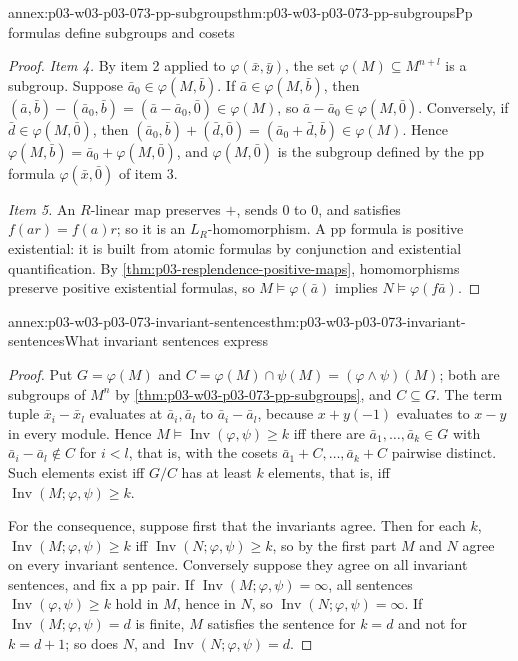 \begin{annexitem}{annex:p03-w03-p03-073-pp-subgroups}{thm:p03-w03-p03-073-pp-subgroups}{Pp formulas define subgroups and cosets}
\begin{proof}
\emph{Item 4.} By item 2 applied to \(\varphi(\bar x,\bar y)\), the set
\(\varphi(M)\subseteq M^{n+l}\) is a subgroup. Suppose
\(\bar a_0\in\varphi(M,\bar b)\). If \(\bar a\in\varphi(M,\bar b)\), then
\((\bar a,\bar b)-(\bar a_0,\bar b)=(\bar a-\bar a_0,\bar 0)\in\varphi(M)\),
so \(\bar a-\bar a_0\in\varphi(M,\bar 0)\). Conversely, if
\(\bar d\in\varphi(M,\bar 0)\), then
\((\bar a_0,\bar b)+(\bar d,\bar 0)=(\bar a_0+\bar d,\bar b)\in\varphi(M)\).
Hence \(\varphi(M,\bar b)=\bar a_0+\varphi(M,\bar 0)\), and
\(\varphi(M,\bar 0)\) is the subgroup defined by the pp formula
\(\varphi(\bar x,\bar 0)\) of item 3.

\emph{Item 5.} An \(R\)-linear map preserves \(+\), sends \(0\) to \(0\),
and satisfies \(f(ar)=f(a)r\); so it is an \(L_R\)-homomorphism. A pp
formula is positive existential: it is built from atomic formulas by
conjunction and existential quantification. By
\cref{thm:p03-resplendence-positive-maps}, homomorphisms preserve
positive existential formulas, so \(M\models\varphi(\bar a)\) implies
\(N\models\varphi(f\bar a)\).
\end{proof}
\end{annexitem}

\begin{annexitem}{annex:p03-w03-p03-073-invariant-sentences}{thm:p03-w03-p03-073-invariant-sentences}{What invariant sentences express}
\begin{proof}
Put \(G=\varphi(M)\) and \(C=\varphi(M)\cap\psi(M)=(\varphi\wedge\psi)(M)\);
both are subgroups of \(M^n\) by
\cref{thm:p03-w03-p03-073-pp-subgroups}, and \(C\subseteq G\). The term
tuple \(\bar x_i-\bar x_l\) evaluates at \(\bar a_i,\bar a_l\) to
\(\bar a_i-\bar a_l\), because \(x+y(-1)\) evaluates to \(x-y\) in every
module. Hence \(M\models\operatorname{Inv}(\varphi,\psi)\ge k\) iff there
are \(\bar a_1,\ldots,\bar a_k\in G\) with
\(\bar a_i-\bar a_l\notin C\) for \(i<l\), that is, with the cosets
\(\bar a_1+C,\ldots,\bar a_k+C\) pairwise distinct. Such elements exist iff
\(G/C\) has at least \(k\) elements, that is, iff
\(\operatorname{Inv}(M;\varphi,\psi)\ge k\).

For the consequence, suppose first that the invariants agree. Then for
each \(k\), \(\operatorname{Inv}(M;\varphi,\psi)\ge k\) iff
\(\operatorname{Inv}(N;\varphi,\psi)\ge k\), so by the first part \(M\)
and \(N\) agree on every invariant sentence. Conversely suppose they agree
on all invariant sentences, and fix a pp pair. If
\(\operatorname{Inv}(M;\varphi,\psi)=\infty\), all sentences
\(\operatorname{Inv}(\varphi,\psi)\ge k\) hold in \(M\), hence in \(N\), so
\(\operatorname{Inv}(N;\varphi,\psi)=\infty\). If
\(\operatorname{Inv}(M;\varphi,\psi)=d\) is finite, \(M\) satisfies the
sentence for \(k=d\) and not for \(k=d+1\); so does \(N\), and
\(\operatorname{Inv}(N;\varphi,\psi)=d\).
\end{proof}
\end{annexitem}

